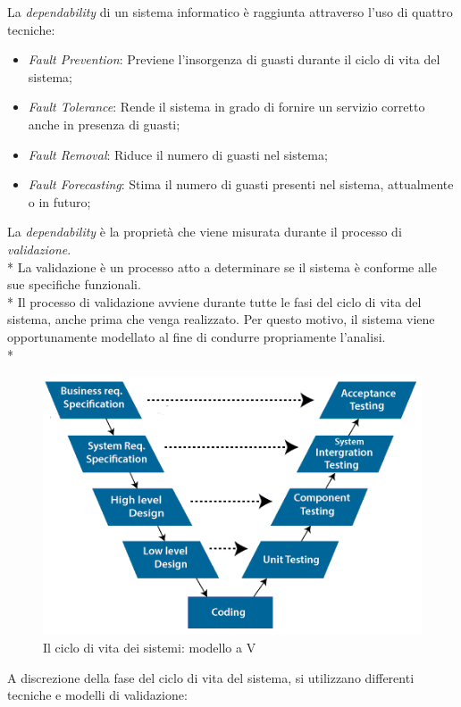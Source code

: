 La \emph{dependability} di un sistema informatico \`e raggiunta attraverso l'uso di quattro tecniche:
\begin{itemize}
	\item \emph{Fault Prevention}: Previene l'insorgenza di guasti durante il ciclo di vita del sistema;
	\item \emph{Fault Tolerance}: Rende il sistema in grado di fornire un servizio corretto anche in presenza di guasti;
	\item \emph{Fault Removal}: Riduce il numero di guasti nel sistema;
	\item \emph{Fault Forecasting}: Stima il numero di guasti presenti nel sistema, attualmente o in futuro;
\end{itemize}
La \emph{dependability} \`e la propriet\`a che viene misurata durante il processo di \emph{validazione}.\\*
La validazione \`e un processo atto a determinare se il sistema \`e conforme alle sue specifiche funzionali.\\*
Il processo di validazione avviene durante tutte le fasi del ciclo di vita del sistema, anche prima che venga realizzato. Per questo motivo, il sistema viene opportunamente modellato al fine di condurre propriamente l'analisi.\\*
\begin{figure}[h]
	\centering
	\includegraphics[width=0.7\linewidth]{img/vmodel}
	\caption{Il ciclo di vita dei sistemi: modello a V}
	\label{fig:vmodel}
\end{figure}
\noindent{}A discrezione della fase del ciclo di vita del sistema, si utilizzano differenti tecniche e modelli di validazione: \cite{librobonda}
